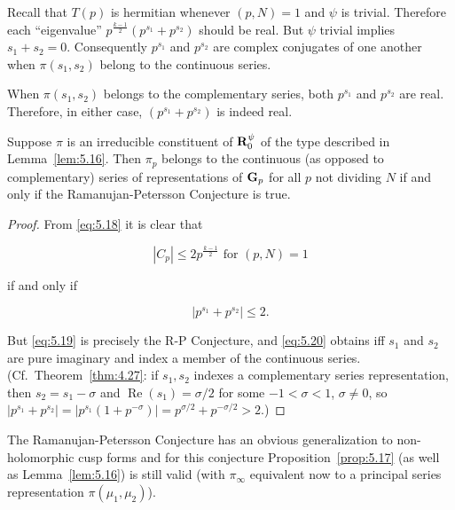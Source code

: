 Recall that $T(p)$ is hermitian whenever $(p, N) = 1$ and $\psi$ is trivial. Therefore each ``eigenvalue'' $p^{\frac{k-1}{2}}(p^{s_1} + p^{s_2})$ should be real. But $\psi$ trivial implies $s_1 + s_2 = 0$. Consequently $p^{s_1}$ and $p^{s_2}$ are complex conjugates of one another when $\pi(s_1, s_2)$ belong to the continuous series.

When $\pi(s_1, s_2)$ belongs to the complementary series, both $p^{s_1}$ and $p^{s_2}$ are real. Therefore, in either case, $(p^{s_1} + p^{s_2})$ is indeed real.

\begin{proposition}\label{prop:5.17}

Suppose $\pi$ is an irreducible constituent of $\mathbf{R}_0^{\psi}$ of the type described in Lemma~\ref{lem:5.16}. Then $\pi_p$ belongs to the continuous (as opposed to complementary) series of representations of $\mathbf{G}_p$ for all $p$ not dividing $N$ if and only if the Ramanujan-Petersson Conjecture is true.

\end{proposition}

\begin{proof}

From \eqref{eq:5.18} it is clear that

\begin{equation}\label{eq:5.19}
|C_p| \leq 2p^{\frac{k-1}{2}} \text{ for } (p,N) = 1\tag{5.19}
\end{equation}

if and only if

\begin{equation}\label{eq:5.20}
|p^{s_1} + p^{s_2}| \leq 2.\tag{5.20}
\end{equation}

But \eqref{eq:5.19} is precisely the R-P Conjecture, and \eqref{eq:5.20} obtains iff $s_1$ and $s_2$ are pure imaginary and index a member of the continuous series. (Cf.\ Theorem~\ref{thm:4.27}: if $s_1, s_2$ indexes a complementary series representation, then $s_2 = s_1 - \sigma$ and $\operatorname{Re}(s_1) = \sigma/2$ for some $-1 < \sigma < 1$, $\sigma \neq 0$, so $|p^{s_1} + p^{s_2}| = |p^{s_1}(1 + p^{-\sigma})| = p^{\sigma/2} + p^{-\sigma/2} > 2$.)

\end{proof}

\begin{remark}\label{rem:5.18}

The Ramanujan-Petersson Conjecture has an obvious generalization to non-holomorphic cusp forms and for this conjecture Proposition~\ref{prop:5.17} (as well as Lemma~\ref{lem:5.16}) is still valid (with $\pi_{\infty}$ equivalent now to a principal series representation $\pi(\mu_1, \mu_2)$).

\end{remark}

